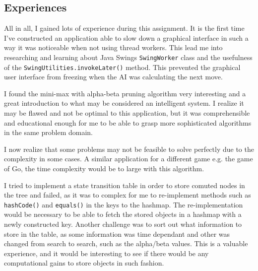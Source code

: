 \documentclass{article}
\begin{document}
\subsection{Experiences}

All in all, I gained lots of experience during this assignment. It is the first time
I've constructed an application able to slow down a graphical interface in such a way
it was noticeable when not using thread workers. This lead me into researching and learning
about Java Swings \verb|SwingWorker| class and the usefulness of the \verb|SwingUtilities.invokeLater()|
method. This prevented the graphical user interface from freezing when the AI was calculating
the next move.

I found the mini-max with alpha-beta pruning algorithm very interesting and a great introduction
to what may be considered an intelligent system. I realize it may be flawed and not be
optimal to this application, but it was comprehensible and educational enough for me to
be able to grasp more sophisticated algorithms in the same problem domain.

I now realize that some problems may not be feasible to solve perfectly due to the
complexity in some cases. A similar application for a different game e.g. the game of Go\citep{alphago},
the time complexity would be to large with this algorithm.

I tried to implement a state transition table in order to store comuted nodes in the tree and failed,
as it was to complex for me to re-implement methods such as \verb|hashCode()| and \verb|equals()| in the keys
to the hashmap. The re-implementation would be necessary to be able to fetch the stored
objects in a hashmap with a newly constructed key. Another challenge was to sort out what information to store
in the table, as some information was time dependant and other was changed from search to search, such
as the alpha/beta values. This is a valuable experience, and it would be interesting to see if
there would be any computational gains to store objects in such fashion.




\end{document}
